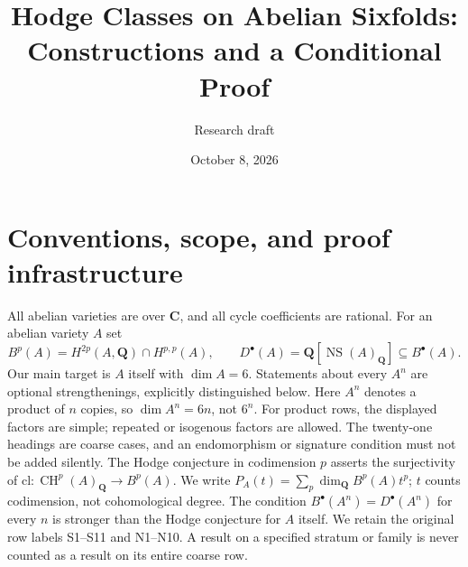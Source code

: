 \documentclass[10pt,reqno]{article}
\title{Hodge Classes on Abelian Sixfolds: Constructions and a Conditional Proof}
\author{Research draft}
\date{October 8, 2026}
\theoremstyle{emphasizedplain}
\theoremstyle{emphasizeddefinition}
\theoremstyle{emphasizeddefinition}
\DeclareMathOperator{\NS}{NS}
\DeclareMathOperator{\CH}{CH}
\newcommand{\Q}{\mathbf Q}
\newcommand{\C}{\mathbf C}
\newcommand{\B}{B}
\newcommand{\D}{D}
\renewcommand{\normalsize}{\fontsize{9}{10.6}\selectfont
 \abovedisplayskip=7pt plus 2pt minus 2pt
 \belowdisplayskip=7pt plus 2pt minus 2pt
 \abovedisplayshortskip=0pt plus 2pt
 \belowdisplayshortskip=4pt plus 2pt minus 2pt}
\renewcommand{\small}{\fontsize{8.4}{10}\selectfont}
\begin{document}
\begingroup
\renewcommand{\normalsize}{\fontsize{11}{13.2}\selectfont}
\renewcommand{\small}{\fontsize{10}{12}\selectfont}
\normalsize

\endgroup
{\setlength{\parskip}{0pt}\tableofcontents}
\clearpage
\section*{Conventions, scope, and proof infrastructure}
All abelian varieties are over $\C$, and all cycle coefficients are rational.
For an abelian variety $A$ set
\[
 \B^p(A)=H^{2p}(A,\Q)\cap H^{p,p}(A),\qquad
 \D^\bullet(A)=\Q[\NS(A)_\Q]\subseteq\B^\bullet(A).
\]
Our main target is $A$ itself with $\dim A=6$. Statements about every
$A^n$ are optional strengthenings, explicitly distinguished below.
Here $A^n$ denotes a product of $n$ copies, so $\dim A^n=6n$, not $6^n$.
For product rows, the displayed factors are simple; repeated or isogenous
factors are allowed. The twenty-one headings are coarse cases, and an
endomorphism or signature condition must not be added silently.
The Hodge conjecture in codimension $p$ asserts the surjectivity of
$\mathrm{cl}:\CH^p(A)_\Q\longrightarrow\B^p(A)$.
We write $P_A(t)=\sum_p\dim_\Q\B^p(A)t^p$; $t$ counts codimension,
not cohomological degree. The condition $\B^\bullet(A^n)=\D^\bullet(A^n)$
for every $n$ is stronger than the Hodge conjecture for $A$ itself.
We retain the original row labels S1--S11 and N1--N10. A result on a specified
stratum or family is never counted as a result on its entire coarse row.
\end{document}
